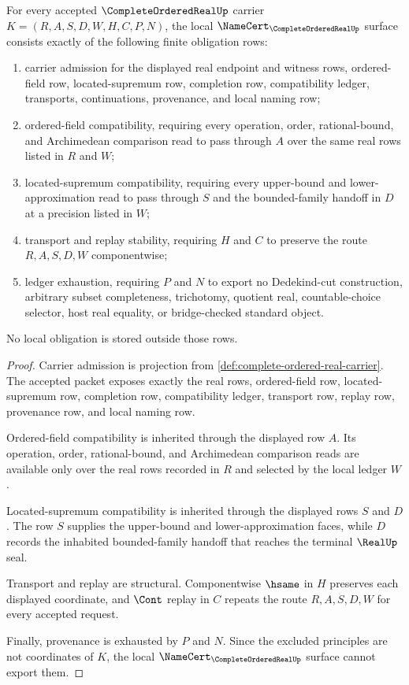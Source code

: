 \begin{theorem}
\label{thm:complete-ordered-real-namecert-obligations}
For every accepted $\CompleteOrderedRealUp$ carrier $K=(R,A,S,D,W,H,C,P,N)$, the local $\NameCert_{\CompleteOrderedRealUp}$ surface consists exactly of the following finite obligation rows:
\begin{enumerate}
\item carrier admission for the displayed real endpoint and witness rows, ordered-field row, located-supremum row, completion row, compatibility ledger, transports, continuations, provenance, and local naming row;
\item ordered-field compatibility, requiring every operation, order, rational-bound, and Archimedean comparison read to pass through $A$ over the same real rows listed in $R$ and $W$;
\item located-supremum compatibility, requiring every upper-bound and lower-approximation read to pass through $S$ and the bounded-family handoff in $D$ at a precision listed in $W$;
\item transport and replay stability, requiring $H$ and $C$ to preserve the route $R,A,S,D,W$ componentwise;
\item ledger exhaustion, requiring $P$ and $N$ to export no Dedekind-cut construction, arbitrary subset completeness, trichotomy, quotient real, countable-choice selector, host real equality, or bridge-checked standard object.
\end{enumerate}
No local obligation is stored outside those rows.
\end{theorem}
\begin{proof}
Carrier admission is projection from \autoref{def:complete-ordered-real-carrier}. The accepted packet exposes exactly the real rows, ordered-field row, located-supremum row, completion row, compatibility ledger, transport row, replay row, provenance row, and local naming row.

Ordered-field compatibility is inherited through the displayed row $A$. Its operation, order, rational-bound, and Archimedean comparison reads are available only over the real rows recorded in $R$ and selected by the local ledger $W$.

Located-supremum compatibility is inherited through the displayed rows $S$ and $D$. The row $S$ supplies the upper-bound and lower-approximation faces, while $D$ records the inhabited bounded-family handoff that reaches the terminal $\RealUp$ seal.

Transport and replay are structural. Componentwise $\hsame$ in $H$ preserves each displayed coordinate, and $\Cont$ replay in $C$ repeats the route $R,A,S,D,W$ for every accepted request.

Finally, provenance is exhausted by $P$ and $N$. Since the excluded principles are not coordinates of $K$, the local $\NameCert_{\CompleteOrderedRealUp}$ surface cannot export them.
\end{proof}

